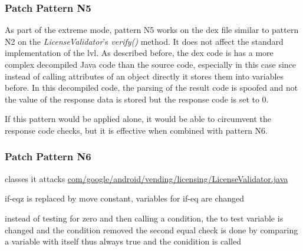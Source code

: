 \subsubsection{Patch Pattern N5}
As part of the extreme mode, pattern N5 works on the \gls{dex} file similar to pattern N2 on the \textit{LicenseValidator}'s \textit{verify()} method. It does not affect the standard implementation of the \gls{lvl}.
\newline
As described before, the dex code is has a more complex decompiled Java code than the source code, especially in this case since instead of calling attributes of an object directly it stores them into variables before.
In this decompiled code, the parsing of the result code is spoofed and not the value of the response data is stored but the response code is set to 0.
\newline


If this pattern would be applied alone, it would be able to circumvent the response code checks, but it is effective when combined with pattern N6.


\subsubsection{Patch Pattern N6}
classes it attacks %
\url{com/google/android/vending/licensing/LicenseValidator.java}



if-eqz is replaced by move constant, variables for if-eq are changed



instead of testing for zero and then calling a condition, the to test variable is changed and the condition removed
the second equal check is done by comparing a variable with itself thus always true and the conidition is called

